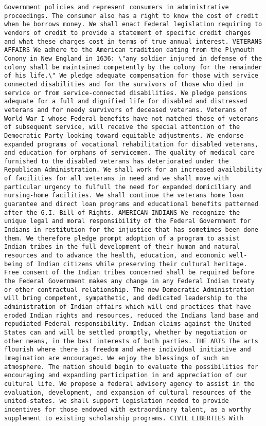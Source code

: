 \documentclass[
]{article}
\begin{document}
\begin{verbatim}
Government policies and represent consumers in administrative proceedings. The consumer also has a right to know the cost of credit when he borrows money. We shall enact Federal legislation requiring to vendors of credit to provide a statement of specific credit charges and what these charges cost in terms of true annual interest. VETERANS AFFAIRS We adhere to the American tradition dating from the Plymouth Conony in New England in 1636: \"any soldier injured in defense of the colony shall be maintained competently by the colony for the remainder of his life.\" We pledge adequate compensation for those with service connected disabilities and for the survivors of those who died in service or from service-connected disabilities. We pledge pensions adequate for a full and dignified life for disabled and distressed veterans and for needy survivors of deceased veterans. Veterans of World War I whose Federal benefits have not matched those of veterans of subsequent service, will receive the special attention of the Democratic Party looking toward equitable adjustments. We endorse expanded programs of vocational rehabilitation for disabled veterans, and education for orphans of servicemen. The quality of medical care furnished to the disabled veterans has deteriorated under the Republican Administration. We shall work for an increased availability of facilities for all veterans in need and we shall move with particular urgency to fulfull the need for expanded domiciliary and nursing-home facilities. We shall continue the veterans home loan guarantee and direct loan programs and educational benefits patterned after the G.I. Bill of Rights. AMERICAN INDIANS We recognize the unique legal and moral responsibility of the Federal Government for Indians in restitution for the injustice that has sometimes been done them. We therefore pledge prompt adoption of a program to assist Indian tribes in the full development of their human and natural resources and to advance the health, education, and economic well-being of Indian citizens while preserving their cultural heritage. Free consent of the Indian tribes concerned shall be required before the Federal Government makes any change in any Federal Indian treaty or other contractual relationship. The new Democratic Administration will bring competent, sympathetic, and dedicated leadership to the administration of Indian affairs which will end practices that have eroded Indian rights and resources, reduced the Indians land base and repudiated Federal responsibility. Indian claims against the United States can and will be settled promptly, whether by negotiation or other means, in the best interests of both parties. THE ARTS The arts flourish where there is freedom and where individual initiative and imagination are encouraged. We enjoy the blessings of such an atmosphere. The nation should begin to evaluate the possibilities for encouraging and expanding participation in and appreciation of our cultural life. We propose a federal advisory agency to assist in the evaluation, development, and expansion of cultural resources of the united-states. we shall support legislation needed to provide incentives for those endowed with extraordinary talent, as a worthy supplement to existing scholarship programs. CIVIL LIBERTIES With 
\end{verbatim}
\end{document}
